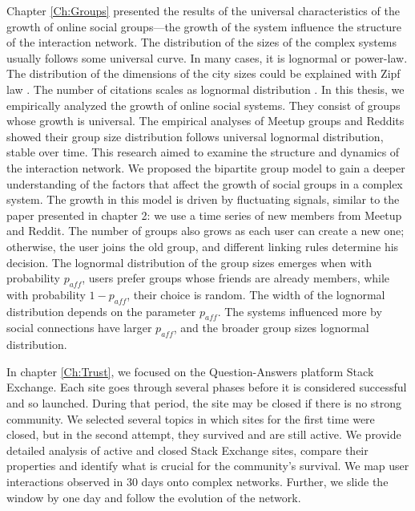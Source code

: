 Chapter \ref{Ch:Groups} presented the results of the universal characteristics of the growth of online social groups—the growth of the system influence the structure of the interaction network. The distribution of the sizes of the complex systems usually follows some universal curve. In many cases, it is lognormal or power-law. The distribution of the dimensions of the city sizes could be explained with Zipf law \cite{gabaix1999}. The number of citations scales as lognormal distribution \cite{radicchi2008}. In this thesis, we empirically analyzed the growth of online social systems. They consist of groups whose growth is universal. The empirical analyses of Meetup groups and Reddits showed their group size distribution follows universal lognormal distribution, stable over time. This research aimed to examine the structure and dynamics of the interaction network. We proposed the bipartite group model to gain a deeper understanding of the factors that affect the growth of social groups in a complex system. The growth in this model is driven by fluctuating signals, similar to the paper presented in chapter 2: we use a time series of new members from Meetup and Reddit. The number of groups also grows as each user can create a new one; otherwise, the user joins the old group, and different linking rules determine his decision. The lognormal distribution of the group sizes emerges when with probability $p_{aff}$, users prefer groups whose friends are already members, while with probability $1-p_{aff}$, their choice is random. The width of the lognormal distribution depends on the parameter $p_{aff}$. The systems influenced more by social connections have larger $p_{aff}$, and the broader group sizes lognormal distribution.

In chapter \ref{Ch:Trust}, we focused on the Question-Answers platform Stack Exchange. Each site goes through several phases before it is considered successful and so launched. During that period, the site may be closed if there is no strong community. We selected several topics in which sites for the first time were closed, but in the second attempt, they survived and are still active. We provide detailed analysis of active and closed Stack Exchange sites, compare their properties and identify what is crucial for the community's survival. We map user interactions observed in 30 days onto complex networks. Further, we slide the window by one day and follow the evolution of the network. 

